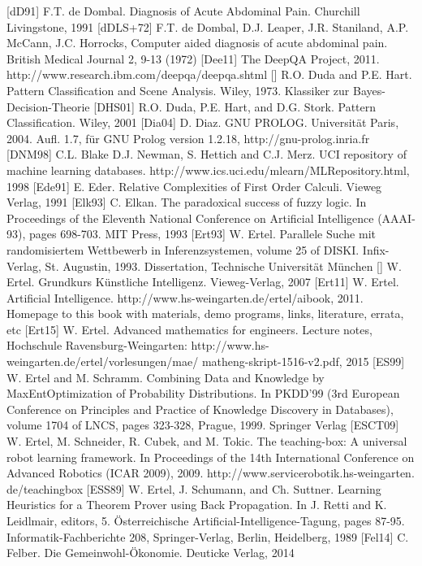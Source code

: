 \documentclass[10pt]{book}
\begin{document}
[dD91] F.T. de Dombal. Diagnosis of Acute Abdominal Pain. Churchill Livingstone, 1991
[dDLS+72] F.T. de Dombal, D.J. Leaper, J.R. Staniland, A.P. McCann, J.C. Horrocks, Computer aided diagnosis of acute abdominal pain. British Medical Journal 2, 9-13 (1972)
[Dee11] The DeepQA Project, 2011. http://www.research.ibm.com/deepqa/deepqa.shtml
[\cite{duda1973pattern}] R.O. Duda and P.E. Hart. Pattern Classification and Scene Analysis. Wiley, 1973. Klassiker zur Bayes-Decision-Theorie
[DHS01] R.O. Duda, P.E. Hart, and D.G. Stork. Pattern Classification. Wiley, 2001
[Dia04] D. Diaz. GNU PROLOG. Universität Paris, 2004. Aufl. 1.7, für GNU Prolog version 1.2.18, http://gnu-prolog.inria.fr
[DNM98] C.L. Blake D.J. Newman, S. Hettich and C.J. Merz. UCI repository of machine learning databases. http://www.ics.uci.edu/mlearn/MLRepository.html, 1998
[Ede91] E. Eder. Relative Complexities of First Order Calculi. Vieweg Verlag, 1991
[Elk93] C. Elkan. The paradoxical success of fuzzy logic. In Proceedings of the Eleventh National Conference on Artificial Intelligence (AAAI-93), pages 698-703. MIT Press, 1993
[Ert93] W. Ertel. Parallele Suche mit randomisiertem Wettbewerb in Inferenzsystemen, volume 25 of DISKI. Infix-Verlag, St. Augustin, 1993. Dissertation, Technische Universität München
[\cite{ertel2007grundkurs}] W. Ertel. Grundkurs Künstliche Intelligenz. Vieweg-Verlag, 2007
[Ert11] W. Ertel. Artificial Intelligence. http://www.hs-weingarten.de/ertel/aibook, 2011. Homepage to this book with materials, demo programs, links, literature, errata, etc
[Ert15] W. Ertel. Advanced mathematics for engineers. Lecture notes, Hochschule Ravensburg-Weingarten: http://www.hs-weingarten.de/ertel/vorlesungen/mae/ matheng-skript-1516-v2.pdf, 2015
[ES99] W. Ertel and M. Schramm. Combining Data and Knowledge by MaxEntOptimization of Probability Distributions. In PKDD'99 (3rd European Conference on Principles and Practice of Knowledge Discovery in Databases), volume 1704 of LNCS, pages 323-328, Prague, 1999. Springer Verlag
[ESCT09] W. Ertel, M. Schneider, R. Cubek, and M. Tokic. The teaching-box: A universal robot learning framework. In Proceedings of the 14th International Conference on Advanced Robotics (ICAR 2009), 2009. http://www.servicerobotik.hs-weingarten. de/teachingbox
[ESS89] W. Ertel, J. Schumann, and Ch. Suttner. Learning Heuristics for a Theorem Prover using Back Propagation. In J. Retti and K. Leidlmair, editors, 5. Österreichische Artificial-Intelligence-Tagung, pages 87-95. Informatik-Fachberichte 208, Springer-Verlag, Berlin, Heidelberg, 1989
[Fel14] C. Felber. Die Gemeinwohl-Ökonomie. Deuticke Verlag, 2014
\end{document}
